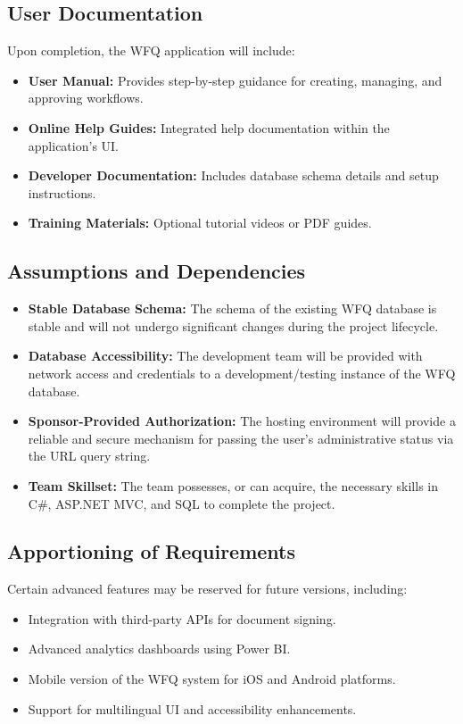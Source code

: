 \documentclass[12pt]{article}
\begin{document}
\subsection{User Documentation}
Upon completion, the WFQ application will include:
\begin{itemize}
    \item \textbf{User Manual:} Provides step-by-step guidance for creating, managing, and
    approving workflows.
    \item \textbf{Online Help Guides:} Integrated help documentation within the application's
    UI.
    \item \textbf{Developer Documentation:} Includes database schema details and setup
    instructions.
    \item \textbf{Training Materials:} Optional tutorial videos or PDF guides.
\end{itemize}

\subsection{Assumptions and Dependencies}
\begin{itemize}
    \item \textbf{Stable Database Schema:} The schema of the existing WFQ database is stable
    and will not undergo significant changes during the project lifecycle.
    \item \textbf{Database Accessibility:} The development team will be provided with network
    access and credentials to a development/testing instance of the WFQ database.
    \item \textbf{Sponsor-Provided Authorization:} The hosting environment will provide a
    reliable and secure mechanism for passing the user's administrative status via the URL
    query string.
    \item \textbf{Team Skillset:} The team possesses, or can acquire, the necessary skills in
    C\#, ASP.NET MVC, and SQL to complete the project.
\end{itemize}

\subsection{Apportioning of Requirements}
Certain advanced features may be reserved for future versions, including:
\begin{itemize}
    \item Integration with third-party APIs for document signing.
    \item Advanced analytics dashboards using Power BI.
    \item Mobile version of the WFQ system for iOS and Android platforms.
    \item Support for multilingual UI and accessibility enhancements.
\end{itemize}
\end{document}
